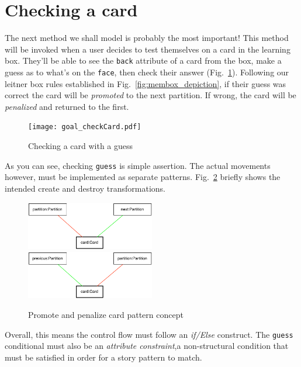 \newpage
\hypertarget{sec:checkCard}{}
\section{Checking a card}
\genHeader

The next method we shall model is probably the most important! This method will be invoked when a user decides to test themselves on a card in the
learning box. They'll be able to see the \texttt{back} attribute of a card from the box, make a guess as to what's on the \texttt{face}, then 
check their answer (Fig.~\ref{fig:goal_check}). Following our leitner box rules established in Fig.~\ref{fig:membox_depiction}, if their guess was correct the card will be
\emph{promoted} to the next partition. If wrong, the card will be \emph{penalized} and returned to the first.

\begin{figure}[htbp]
 	\centering
   \texttt{[image: goal\_checkCard.pdf]}
 	\caption{Checking a card with a guess}
 	\label{fig:goal_check}
\end{figure}
\FloatBarrier

As you can see, checking \texttt{guess} is simple assertion. The actual movements however, must be implemented as separate patterns.
Fig.~\ref{fig:patterns_check} briefly shows the intended create and destroy transformations.

\begin{figure}[htbp]
 	\centering
   \includegraphics[width=0.5\textwidth]{checkCard_promote.pdf}
   \\ \vspace{1cm}
    \includegraphics[width=0.5\textwidth]{checkCard_penalize.pdf}
 	\caption{Promote and penalize card pattern concept}
 	\label{fig:patterns_check}
\end{figure}
\FloatBarrier

Overall, this means the control flow must follow an \emph{if/Else} construct. The \texttt{guess} conditional must also be an \emph{attribute
constraint},a non-structural condition that must be satisfied in order for a story pattern to match. 





